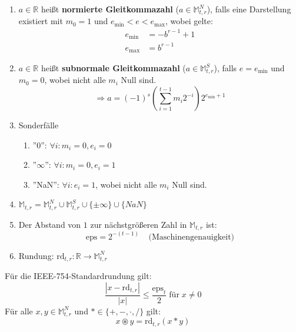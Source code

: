 \documentclass[a4paper,twocolumn,10pt]{article}
\begin{document}
\begin{enumerate}[label=$\bullet$]
\item $a\in\mathbb{R}$ heißt \textbf{normierte Gleitkommazahl} ($a\in\mathbb{M}_{t,r}^N$), falls eine Darstellung existiert mit $m_0=1$ und $e_{\text{min}}<e<e_{\text{max}}$, wobei gelte:
\begin{equation*}
\begin{split}
e_{\text{min}}&=-b^{r-1}+1\\
e_{\text{max}}&=b^{r-1}
\end{split}
\end{equation*}
\item $a\in\mathbb{R}$ heißt \textbf{subnormale Gleitkommazahl} ($a\in\mathbb{M}_{t,r}^S$), falls $e=e_{\text{min}}$ und $m_0=0$, wobei nicht alle $m_i$ Null sind.
\begin{equation*}
\Rightarrow a=(-1)^s\left(\sum_{i=1}^{t-1}m_i2^{-i}\right)2^{e_{\text{min}}+1}
\end{equation*}
\item Sonderfälle
\begin{enumerate}[label=-]
\item ''0'': $\forall i: m_i=0,e_i=0$
\item ''$\infty$'': $\forall i: m_i=0, e_i=1$
\item ''NaN'': $\forall i: e_i=1$, wobei nicht alle $m_i$ Null sind.
\end{enumerate}
\item $\mathbb{M}_{t,r}=\mathbb{M}_{t,r}^N\cup\mathbb{M}_{t,r}^S\cup\{\pm\infty\}\cup\{NaN\}$
\item Der Abstand von $1$ zur nächstgrößeren Zahl in $\mathbb{M}_{t,r}$ ist:
\begin{equation*}
\text{eps}=2^{-(t-1)}\;\;\;\;\text{(Maschinengenauigkeit)}
\end{equation*}
\item Rundung: $\text{rd}_{t,r}:\mathbb{R}\rightarrow\mathbb{M}_{t,r}^N$
\end{enumerate}
Für die IEEE-754-Standardrundung gilt:
\begin{equation*}
\frac{|x-\text{rd}_{t,r}|}{|x|}\leq\frac{\text{eps}_t}{2}\;\text{für}\;x\neq 0
\end{equation*}
Für alle $x,y\in\mathbb{M}_{t,r}^N$ und $*\in\{+,-,\cdot,/\}$ gilt:
\begin{equation*}
x\circledast y=\text{rd}_{t,r}(x*y)
\end{equation*}
\end{document}
